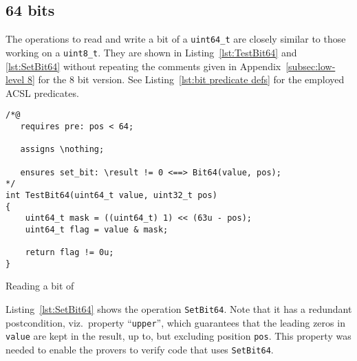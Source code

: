 \FloatBarrier

\subsection{64 bits}
\label{subsec:low-level 64}



The operations to read and write a bit of a \lstinline{uint64_t}
are closely similar to
those working on a \lstinline{uint8_t}.
%
They are shown in Listing~\ref{lst:TestBit64}
and \ref{lst:SetBit64} without repeating the comments given
in Appendix~\ref{subsec:low-level 8} for the 8 bit version.
%
See Listing~\ref{lst:bit predicate defs} for the employed ACSL predicates.





\begin{listing}[hbt]
\begin{minipage}{0.99\textwidth}
\begin{lstlisting}[style=acsl-block]
/*@
   requires pre: pos < 64;

   assigns \nothing;

   ensures set_bit: \result != 0 <==> Bit64(value, pos);
*/
int TestBit64(uint64_t value, uint32_t pos)
{
    uint64_t mask = ((uint64_t) 1) << (63u - pos);
    uint64_t flag = value & mask;

    return flag != 0u;
}
\end{lstlisting}
\end{minipage}
\caption{\label{lst:TestBit64}Reading a bit of }
\end{listing}








Listing~\ref{lst:SetBit64} shows the operation \lstinline{SetBit64}.
%
Note that it has a redundant postcondition, viz.\ property
``\lstinline{upper}'', which guarantees that the leading zeros in
\lstinline{value} are kept in the result, up to, but excluding
position \lstinline{pos}.
%
This property was needed to enable the provers to verify code that uses
\lstinline{SetBit64}.




